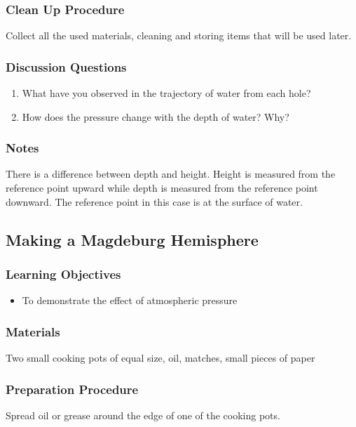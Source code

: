 \subsubsection*{Clean Up Procedure}
Collect all the used materials, cleaning and storing items that will be used later.

\subsubsection*{Discussion Questions}
\begin{enumerate}
\item{What have you observed in the trajectory of water from each hole?}
\item{How does the pressure change with the depth of water? Why?}
\end{enumerate}

\subsubsection*{Notes}
There is a difference between depth and height. Height is measured from the reference point upward while depth is measured from the reference point downward. The reference point in this case is at the surface of water. 

\subsection{Making a Magdeburg Hemisphere}

\subsubsection*{Learning Objectives}
\begin{itemize}
\item{To demonstrate the effect of atmospheric pressure} 
\end{itemize}

\subsubsection*{Materials}
Two small cooking pots of equal size, oil, matches, small pieces of paper

\subsubsection*{Preparation Procedure}
Spread oil or grease around the edge of one of the cooking pots.

